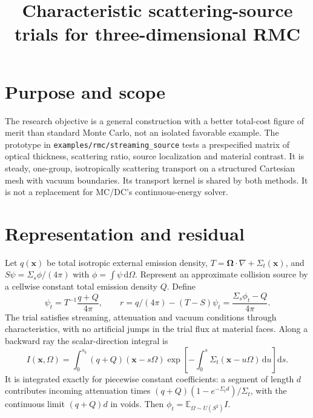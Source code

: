 \documentclass[11pt]{article}
\title{Characteristic scattering-source trials for three-dimensional RMC}
\date{}
\begin{document}
\maketitle

\section{Purpose and scope}
The research objective is a general construction with a better total-cost figure
of merit than standard Monte Carlo, not an isolated favorable example.
The prototype in \texttt{examples/rmc/streaming\_source} tests a prespecified
matrix of optical thickness, scattering ratio, source localization and material
contrast. It is steady, one-group, isotropically scattering transport on a
structured Cartesian mesh with vacuum boundaries. Its transport kernel is shared
by both methods. It is not a replacement for MC/DC's continuous-energy solver.

\section{Representation and residual}
Let $q(\mathbf x)$ be total isotropic external emission density,
$T=\boldsymbol\Omega\cdot\nabla+\Sigma_t(\mathbf x)$, and
$S\psi=\Sigma_s\phi/(4\pi)$ with $\phi=\int\psi\,\mathrm d\Omega$.
Represent an approximate collision source by a cellwise constant total emission
density $Q$. Define
\begin{equation}
 \psi_t=T^{-1}\frac{q+Q}{4\pi},\qquad
 r=q/(4\pi)-(T-S)\psi_t
   =\frac{\Sigma_s\phi_t-Q}{4\pi}.
\end{equation}
The trial satisfies streaming, attenuation and vacuum conditions through
characteristics, with no artificial jumps in the trial flux at material faces.
Along a backward ray the scalar-direction integral is
\begin{equation}
 I(\mathbf x,\Omega)=\int_0^{s_b}(q+Q)(\mathbf x-s\Omega)
 \exp\left[-\int_0^s\Sigma_t(\mathbf x-u\Omega)\,\mathrm du\right]\mathrm ds.
\end{equation}
It is integrated exactly for piecewise constant coefficients: a segment of length
$d$ contributes incoming attenuation times
$(q+Q)(1-e^{-\Sigma_t d})/\Sigma_t$, with the continuous limit $(q+Q)d$ in voids.
Then $\phi_t=\mathbb E_{\Omega\sim U(S^2)}I$.
\end{document}
